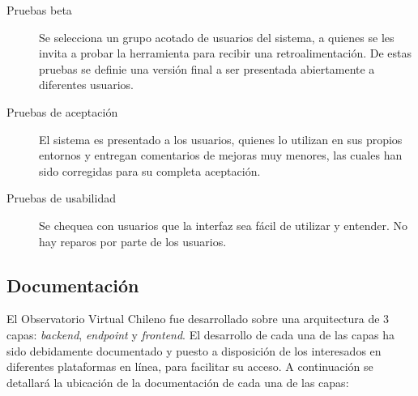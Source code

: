 \begin{description}
\begin{description}
				\begin{description}
					\item[Pruebas beta] Se selecciona un grupo acotado de usuarios del sistema, a quienes se les invita a probar la herramienta para recibir una retroalimentación. De estas pruebas se definie una versión final a ser presentada abiertamente a diferentes usuarios.
					\item[Pruebas de aceptación] El sistema es presentado a los usuarios, quienes lo utilizan en sus propios entornos y entregan comentarios de mejoras muy menores, las cuales han sido corregidas para su completa aceptación.
					\item[Pruebas de usabilidad] Se chequea con usuarios que la interfaz sea fácil de utilizar y entender. No hay reparos por parte de los usuarios.
				\end{description}
		\end{description}
\end{description}

\subsection{Documentación}\label{sec:doc}

El Observatorio Virtual Chileno fue desarrollado sobre una arquitectura de 3 capas: \emph{backend}, \emph{endpoint} y \emph{frontend}. El desarrollo de cada una de las capas ha sido debidamente documentado y puesto a disposición de los interesados en diferentes plataformas en línea, para facilitar su acceso. A continuación se detallará la ubicación de la documentación de cada una de las capas:

